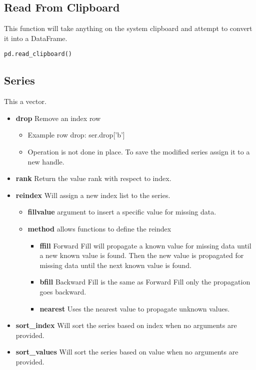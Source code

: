 \subsection{Read From Clipboard}
This function will take anything on the system clipboard and attempt to convert
it into a DataFrame.
\begin{lstlisting}
pd.read_clipboard()
\end{lstlisting}

\subsection{Series}
This a vector.
\begin{itemize}
  \item \textbf{drop} Remove an index row
    \begin{itemize}
      \item Example row drop: ser.drop['b']
      \item Operation is not done in place.  To save the modified series
        assign it to a new handle.
    \end{itemize}
  \item \textbf{rank} Return the value rank with respect to index.
  \item \textbf{reindex} Will assign a new index list to the series.
    \begin{itemize}
      \item \textbf{fill\textunderscore value} argument to insert a specific
        value for missing data.
      \item \textbf{method} allows functions to define the reindex
        \begin{itemize}
          \item \textbf{ffill} Forward Fill will propagate a known value for
            missing data until a new known value is found.  Then the new value
            is propagated for missing data until the next known value is found.
          \item \textbf{bfill} Backward Fill is the same as Forward Fill only
            the propagation goes backward.
          \item \textbf{nearest} Uses the nearest value to propagate unknown
            values.
        \end{itemize}
    \end{itemize}
  \item \textbf{sort\_index} Will sort the series based on index when no
    arguments are provided.
  \item \textbf{sort\_values} Will sort the series based on value when no
    arguments are provided.
\end{itemize}
